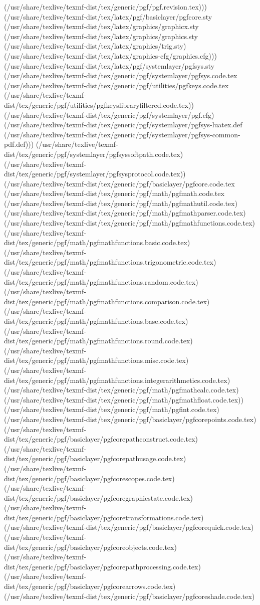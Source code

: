 (/usr/share/texlive/texmf-dist/tex/generic/pgf/pgf.revision.tex))) (/usr/share/texlive/texmf-dist/tex/latex/pgf/basiclayer/pgfcore.sty (/usr/share/texlive/texmf-dist/tex/latex/graphics/graphicx.sty (/usr/share/texlive/texmf-dist/tex/latex/graphics/graphics.sty (/usr/share/texlive/texmf-dist/tex/latex/graphics/trig.sty) (/usr/share/texlive/texmf-dist/tex/latex/graphics-cfg/graphics.cfg))) (/usr/share/texlive/texmf-dist/tex/latex/pgf/systemlayer/pgfsys.sty (/usr/share/texlive/texmf-dist/tex/generic/pgf/systemlayer/pgfsys.code.tex (/usr/share/texlive/texmf-dist/tex/generic/pgf/utilities/pgfkeys.code.tex (/usr/share/texlive/texmf-dist/tex/generic/pgf/utilities/pgfkeyslibraryfiltered.code.tex)) (/usr/share/texlive/texmf-dist/tex/generic/pgf/systemlayer/pgf.cfg) (/usr/share/texlive/texmf-dist/tex/generic/pgf/systemlayer/pgfsys-luatex.def (/usr/share/texlive/texmf-dist/tex/generic/pgf/systemlayer/pgfsys-common-pdf.def))) (/usr/share/texlive/texmf-dist/tex/generic/pgf/systemlayer/pgfsyssoftpath.code.tex) (/usr/share/texlive/texmf-dist/tex/generic/pgf/systemlayer/pgfsysprotocol.code.tex)) (/usr/share/texlive/texmf-dist/tex/generic/pgf/basiclayer/pgfcore.code.tex (/usr/share/texlive/texmf-dist/tex/generic/pgf/math/pgfmath.code.tex (/usr/share/texlive/texmf-dist/tex/generic/pgf/math/pgfmathutil.code.tex) (/usr/share/texlive/texmf-dist/tex/generic/pgf/math/pgfmathparser.code.tex) (/usr/share/texlive/texmf-dist/tex/generic/pgf/math/pgfmathfunctions.code.tex) (/usr/share/texlive/texmf-dist/tex/generic/pgf/math/pgfmathfunctions.basic.code.tex) (/usr/share/texlive/texmf-dist/tex/generic/pgf/math/pgfmathfunctions.trigonometric.code.tex) (/usr/share/texlive/texmf-dist/tex/generic/pgf/math/pgfmathfunctions.random.code.tex) (/usr/share/texlive/texmf-dist/tex/generic/pgf/math/pgfmathfunctions.comparison.code.tex) (/usr/share/texlive/texmf-dist/tex/generic/pgf/math/pgfmathfunctions.base.code.tex) (/usr/share/texlive/texmf-dist/tex/generic/pgf/math/pgfmathfunctions.round.code.tex) (/usr/share/texlive/texmf-dist/tex/generic/pgf/math/pgfmathfunctions.misc.code.tex) (/usr/share/texlive/texmf-dist/tex/generic/pgf/math/pgfmathfunctions.integerarithmetics.code.tex) (/usr/share/texlive/texmf-dist/tex/generic/pgf/math/pgfmathcalc.code.tex) (/usr/share/texlive/texmf-dist/tex/generic/pgf/math/pgfmathfloat.code.tex)) (/usr/share/texlive/texmf-dist/tex/generic/pgf/math/pgfint.code.tex) (/usr/share/texlive/texmf-dist/tex/generic/pgf/basiclayer/pgfcorepoints.code.tex) (/usr/share/texlive/texmf-dist/tex/generic/pgf/basiclayer/pgfcorepathconstruct.code.tex) (/usr/share/texlive/texmf-dist/tex/generic/pgf/basiclayer/pgfcorepathusage.code.tex) (/usr/share/texlive/texmf-dist/tex/generic/pgf/basiclayer/pgfcorescopes.code.tex) (/usr/share/texlive/texmf-dist/tex/generic/pgf/basiclayer/pgfcoregraphicstate.code.tex) (/usr/share/texlive/texmf-dist/tex/generic/pgf/basiclayer/pgfcoretransformations.code.tex) (/usr/share/texlive/texmf-dist/tex/generic/pgf/basiclayer/pgfcorequick.code.tex) (/usr/share/texlive/texmf-dist/tex/generic/pgf/basiclayer/pgfcoreobjects.code.tex) (/usr/share/texlive/texmf-dist/tex/generic/pgf/basiclayer/pgfcorepathprocessing.code.tex) (/usr/share/texlive/texmf-dist/tex/generic/pgf/basiclayer/pgfcorearrows.code.tex) (/usr/share/texlive/texmf-dist/tex/generic/pgf/basiclayer/pgfcoreshade.code.tex) 